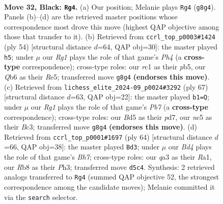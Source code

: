 \documentclass[11pt]{article}
\begin{document}
\clearpage

\begin{figure}[p]\centering
\begin{subfigure}{0.46\textwidth}\centering
\resizebox{\linewidth}{!}{%
\newchessgame
\chessboard[
  setfen={1r1k2r1/p4p1p/1qp5/2Nb4/3P4/Q5P1/5P1P/2R3K1 b - - 0 32},
  showmover=false,
  pgfstyle=straightmove, color=movearrow, markmove={g8-g4}
]}
\caption{}
\end{subfigure}\hfill
\begin{subfigure}{0.46\textwidth}\centering
\resizebox{\linewidth}{!}{%
\newchessgame
\chessboard[
  setfen={3r2k1/p4pp1/2p4p/qp1nR3/7P/3Q1P2/P1P3P1/K2R4 w - - 3 28},
  showmover=false,
  pgfstyle=straightmove, color=movearrow, markmove={h4-h5}
]}
\caption{}
\end{subfigure}
\\[4pt]
\begin{subfigure}{0.46\textwidth}\centering
\resizebox{\linewidth}{!}{%
\newchessgame
\chessboard[
  setfen={qr4k1/3Pp2p/4P1p1/8/p1Q5/2b2N1P/1p3PP1/3R2K1 b - - 5 34},
  showmover=false,
  pgfstyle=straightmove, color=movearrow, markmove={b2-b1}
]}
\caption{}
\end{subfigure}\hfill
\begin{subfigure}{0.46\textwidth}\centering
\resizebox{\linewidth}{!}{%
\newchessgame
\chessboard[
  setfen={r4k2/5ppB/7p/4q3/P2p4/2n4P/2Q2PP1/R5K1 w - - 8 33},
  showmover=false,
  pgfstyle=straightmove, color=movearrow, markmove={h7-d3}
]}
\caption{}
\end{subfigure}
\caption{\textbf{Move 32, Black: \texttt{Rg4}.} (a) Our position; Melanie plays \texttt{Rg4} (\texttt{g8g4}). Panels (b)--(d) are the retrieved master positions whose correspondence most drove this move (highest QAP objective among those that transfer to it). (b) Retrieved from \texttt{ccrl\_top\_p0003\#1424} (ply 54) [structural distance $d$=64, QAP obj=30]: the master played \texttt{h5}; under $\mu$ our \emph{Rg1} plays the role of that game's \emph{Ph4} (a \textbf{cross-type} correspondence); cross-type roles: our \emph{r}c1 as their \emph{p}b5, our \emph{Q}b6 as their \emph{R}e5; transferred move \texttt{g8g4} \textbf{(endorses this move)}. (c) Retrieved from \texttt{lichess\_elite\_2024-09\_p0024\#3292} (ply 67) [structural distance $d$=63, QAP obj=22]: the master played \texttt{b1=Q}; under $\mu$ our \emph{Rg1} plays the role of that game's \emph{Pb7} (a \textbf{cross-type} correspondence); cross-type roles: our \emph{B}d5 as their \emph{p}d7, our \emph{n}c5 as their \emph{B}c3; transferred move \texttt{g8g4} \textbf{(endorses this move)}. (d) Retrieved from \texttt{ccrl\_top\_p0001\#1697} (ply 64) [structural distance $d$=66, QAP obj=38]: the master played \texttt{Bd3}; under $\mu$ our \emph{Bd4} plays the role of that game's \emph{Bh7}; cross-type roles: our \emph{q}a3 as their \emph{R}a1, our \emph{R}b8 as their \emph{P}h3; transferred move \texttt{d5c4}. Synthesis: 2 retrieved analogs transferred to \texttt{Rg4} (summed QAP objective 52, the strongest correspondence among the candidate moves); Melanie committed it via the \texttt{search} selector.}
\label{fig:thought-m63}
\end{figure}
\end{document}
